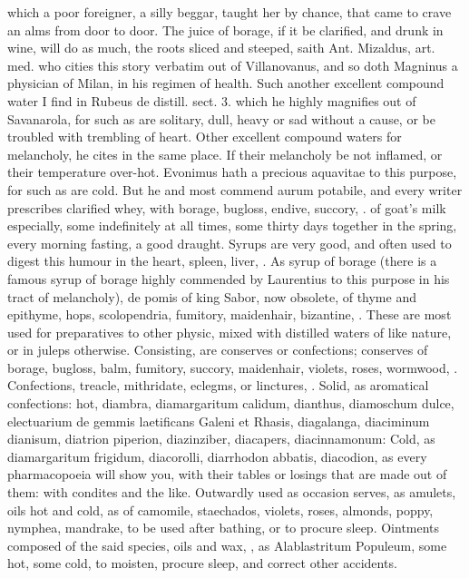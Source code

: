 {which a poor foreigner, a silly beggar, taught her by chance, that came
to crave an alms from door to door. The juice of borage, if it be
clarified, and drunk in wine, will do as much, the roots sliced and
steeped, \etc{} saith Ant. Mizaldus, art. med. who cities this story
verbatim out of Villanovanus, and so doth Magninus a physician of
Milan, in his regimen of health. Such another excellent compound water
I find in Rubeus de distill. sect. 3. which he highly magnifies out of
Savanarola, for such as are solitary, dull, heavy or sad without
a cause, or be troubled with trembling of heart. Other excellent
compound waters for melancholy, he cites in the same place. If
their melancholy be not inflamed, or their temperature over-hot.
Evonimus hath a precious aquavitae to this purpose, for such as are
cold. But he and most commend aurum potabile, and every writer
prescribes clarified whey, with borage, bugloss, endive, succory, \etc{}.
of goat's milk especially, some indefinitely at all times, some thirty
days together in the spring, every morning fasting, a good draught.
Syrups are very good, and often used to digest this humour in the
heart, spleen, liver, \etc{}. As syrup of borage (there is a famous syrup
of borage highly commended by Laurentius to this purpose in his tract
of melancholy), de pomis of king Sabor, now obsolete, of thyme and
epithyme, hops, scolopendria, fumitory, maidenhair, bizantine, \etc{}.
These are most used for preparatives to other physic, mixed with
distilled waters of like nature, or in juleps otherwise.
Consisting, are conserves or confections; conserves of borage, bugloss,
balm, fumitory, succory, maidenhair, violets, roses, wormwood, \etc{}.
Confections, treacle, mithridate, eclegms, or linctures, \etc{}. Solid, as
aromatical confections: hot, diambra, diamargaritum calidum, dianthus,
diamoschum dulce, electuarium de gemmis laetificans Galeni et Rhasis,
diagalanga, diaciminum dianisum, diatrion piperion, diazinziber,
diacapers, diacinnamonum: Cold, as diamargaritum frigidum, diacorolli,
diarrhodon abbatis, diacodion, \etc{} as every pharmacopoeia will show
you, with their tables or losings that are made out of them: with
condites and the like.
Outwardly used as occasion serves, as amulets, oils hot and cold, as of
camomile, staechados, violets, roses, almonds, poppy, nymphea,
mandrake, \etc{} to be used after bathing, or to procure sleep.
Ointments composed of the said species, oils and wax, \etc{}, as
Alablastritum Populeum, some hot, some cold, to moisten, procure sleep,
and correct other accidents.
}
